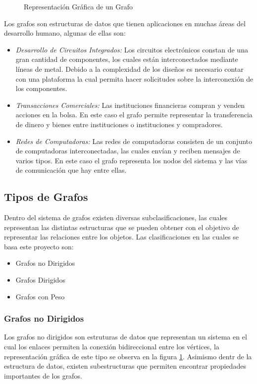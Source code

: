 \documentclass[a4paper, 11pt]{report}
\newcommand{\DrawGraph}[5]{

    \begin{scope}[#4]
    \foreach \pos/\nodo in {{(0,0)/1}, {(2,1)/2}, {(4,1)/3}, {(0,2)/4}, {(3,0)/5}, {(2,-1)/6}, {(4,-1)/7}}
        \node[vertex] (#3\nodo) at \pos {\nodo};

    \foreach \start/\end in {1/4, 1/2, 1/6,2/5,2/3,2/6,5/7,3/7,4/2,6/7}
        \path[edge,#5] (#3\start) -- (#3\end);

    \foreach \nodo in {#1}
        \node[selected vertex] at (#3\nodo) {\nodo};
        

    \begin{pgfonlayer}{background}
        \foreach \start/\end in {#2}
            \path[rojod edge,#5] (#3\start) -- (#3\end);
    \end{pgfonlayer}
    \end{scope}
}
\begin{document}
\begin{figure}[!h]
    \centering
    \caption{Representaci\'on Gr\'afica de un Grafo}
    \label{EjGrafo}
\end{figure}

Los grafos son estructuras de datos que tienen aplicaciones en muchas \'areas del desarrollo humano, algunas de ellas son:

\begin{itemize}
    \item \emph{Desarrollo de Circuitos Integrados:} Los circuitos electr\'onicos constan de una gran cantidad de componentes, los cuales est\'an interconectados mediante l\'ineas de metal. Debido a la complexidad de los dise\~nos es necesario contar con una plataforma la cual permita hacer solicitudes sobre la interconexi\'on de los componentes.
    \item \emph{Transacciones Comerciales:} Las instituciones financieras compran y venden acciones en la bolsa. En este caso el grafo permite representar la transferencia de dinero y bienes entre instituciones o instituciones y compradores.
    \item \emph{Redes de Computadoras:} Las redes de computadoras consisten de un conjunto de computadoras interconectadas, las cuales env\'ian y reciben mensajes de varios tipos. En este caso el grafo representa los nodos del sistema y las v\'ias de comunicaci\'on que hay entre ellas. 
\end{itemize}

\subsection{Tipos de Grafos}
Dentro del sistema de grafos existen diversas subclasificaciones, las cuales representan las distintas estructuras que se pueden obtener con el objetivo de representar las relaciones entre los objetos. Las clasificaciones en las cuales se basa este proyecto son:

\begin{itemize}
    \item Grafos no Dirigidos
    \item Grafos Dirigidos
    \item Grafos con Peso
\end{itemize}

\subsubsection{Grafos no Dirigidos}
Los grafos no dirigidos son estruturas de datos que representan un sistema en el cual los enlaces permiten la conexi\'on bidireccional entre los v\'ertices, la representaci\'on gr\'afica de este tipo se observa en la figura \ref{EjGrafo}. Asimismo dentr de la estructura de datos, existen subestructuras que permiten encontrar propiedades importantes de los grafos.
\end{document}
